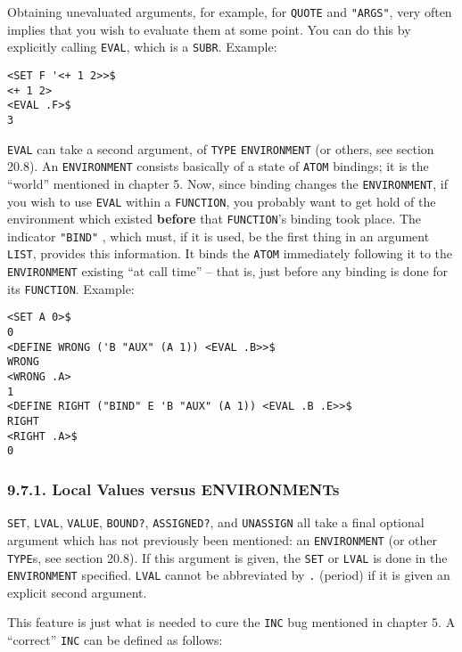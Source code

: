 \documentclass[a4paper,]{article}
\begin{document}
Obtaining unevaluated arguments, for example, for \texttt{QUOTE} and \texttt{"ARGS"}, very often
implies that you wish to evaluate them at some point. You can do this by explicitly calling
\texttt{EVAL}, which is a \texttt{SUBR}. Example:

\begin{verbatim}
<SET F '<+ 1 2>>$
<+ 1 2>
<EVAL .F>$
3
\end{verbatim}

\texttt{EVAL} can take a second argument, of \texttt{TYPE} \texttt{ENVIRONMENT} (or
others, see section 20.8). An \texttt{ENVIRONMENT} consists basically of a state of \texttt{ATOM} bindings; it is the
``world'' mentioned in chapter 5. Now, since binding changes the \texttt{ENVIRONMENT}, if you wish to use \texttt{EVAL}
within a \texttt{FUNCTION}, you probably want to get hold of the environment which existed
\textbf{before} that \texttt{FUNCTION}'s binding took place. The indicator \texttt{"BIND"}
, which must, if it is used, be the first thing in an argument \texttt{LIST}, provides this
information. It binds the \texttt{ATOM} immediately following it to the \texttt{ENVIRONMENT} existing ``at call time'' --
that is, just before any binding is done for its \texttt{FUNCTION}. Example:

\begin{verbatim}
<SET A 0>$
0
<DEFINE WRONG ('B "AUX" (A 1)) <EVAL .B>>$
WRONG
<WRONG .A>
1
<DEFINE RIGHT ("BIND" E 'B "AUX" (A 1)) <EVAL .B .E>>$
RIGHT
<RIGHT .A>$
0
\end{verbatim}

\subsubsection{9.7.1. Local Values versus ENVIRONMENTs}\label{local-values-versus-environments}

\texttt{SET}, \texttt{LVAL}, \texttt{VALUE}, \texttt{BOUND?}, \texttt{ASSIGNED?}, and \texttt{UNASSIGN} all take a final
optional argument which has not previously been mentioned: an \texttt{ENVIRONMENT} (or other
\texttt{TYPE}s, see section 20.8). If this argument is given, the \texttt{SET} or \texttt{LVAL} is done in the
\texttt{ENVIRONMENT} specified. \texttt{LVAL} cannot be abbreviated by \texttt{.} (period) if it is given an explicit
second argument.

This feature is just what is needed to cure the \texttt{INC} bug mentioned in chapter 5. A ``correct'' \texttt{INC} can be
defined as follows:
\end{document}
